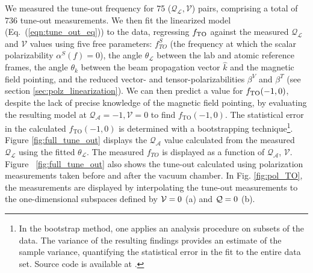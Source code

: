 	We measured the tune-out frequency for 75 (\(\mathcal{Q_{L}},\mathcal{V}\)) pairs, comprising a total of $736$ tune-out measurements.
	We then fit the linearized model (Eq.~(\ref{eqn:tune_out_eq})) to the data, regressing $f_\mathrm{TO}$ against the measured $\mathcal{Q_{L}}$ and $\mathcal{V}$ values using five free parameters: $f^{S}_{TO}$ (the frequency at which the scalar polarizability $\alpha^S(f)=0$), the angle $\theta_{\mathcal{L}}$ between the lab and atomic reference frames, the angle $\theta_{k}$ between the beam propagation vector $\hat{k}$ and the magnetic field pointing, and the reduced vector- and tensor-polarizabilities $\beta^V$ and $\beta^T$ (see section \ref{sec:polz_linearization}).
	We can then predict a value for $f_\mathrm{TO}(-1,0)$, despite the lack of precise knowledge of the magnetic field pointing, by evaluating the resulting model at \(\mathcal{Q_{A}}=-1,\mathcal{V}=0\) to find \(f_{\mathrm{TO}}(-1,0)\). 
	The statistical error in the calculated \(f_{\mathrm{TO}}(-1,0)\) is determined with a bootstrapping technique\footnote{In the bootstrap method, one applies an analysis procedure on subsets of the data. The variance of the resulting findings provides an estimate of the sample variance, quantifying the statistical error in the fit to the entire data set. Source code is available at \cite{bryce_bootstrap_error_code}.}. 
	Figure \ref{fig:full_tune_out} displays the $\mathcal{Q_{A}}$ value calculated from the measured $\mathcal{Q_{L}}$ using the fitted $\theta_{\mathcal{L}}$. The measured \(f_{TO}\) is displayed as a function of $\mathcal{Q_{A}}$, $\mathcal{V}$. Figure ~\ref{fig:full_tune_out} also shows the tune-out calculated using polarization measurements taken before and after the vacuum chamber.
	In Fig. \ref{fig:pol_TO}, the measurements are displayed by interpolating the tune-out measurements to the one-dimensional subspaces defined by $\mathcal{V}=0$ (a) and $\mathcal{Q}=0$ (b).
